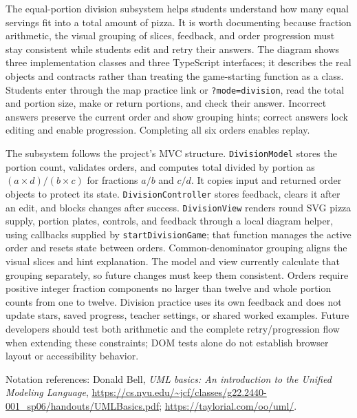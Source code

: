 \documentclass[10pt,letterpaper,landscape]{article}
\begin{document}
\begin{minipage}{0.95\linewidth}
\normalsize
The equal-portion division subsystem helps students understand how many equal servings fit into a total amount of pizza. It is worth documenting because fraction arithmetic, the visual grouping of slices, feedback, and order progression must stay consistent while students edit and retry their answers. The diagram shows three implementation classes and three TypeScript interfaces; it describes the real objects and contracts rather than treating the game-starting function as a class. Students enter through the map practice link or \texttt{?mode=division}, read the total and portion size, make or return portions, and check their answer. Incorrect answers preserve the current order and show grouping hints; correct answers lock editing and enable progression. Completing all six orders enables replay.

The subsystem follows the project's MVC structure. \texttt{DivisionModel} stores the portion count, validates orders, and computes total divided by portion as $(a\times d)/(b\times c)$ for fractions $a/b$ and $c/d$. It copies input and returned order objects to protect its state. \texttt{DivisionController} stores feedback, clears it after an edit, and blocks changes after success. \texttt{DivisionView} renders round SVG pizza supply, portion plates, controls, and feedback through a local diagram helper, using callbacks supplied by \texttt{startDivisionGame}; that function manages the active order and resets state between orders. Common-denominator grouping aligns the visual slices and hint explanation. The model and view currently calculate that grouping separately, so future changes must keep them consistent. Orders require positive integer fraction components no larger than twelve and whole portion counts from one to twelve. Division practice uses its own feedback and does not update stars, saved progress, teacher settings, or shared worked examples. Future developers should test both arithmetic and the complete retry/progression flow when extending these constraints; DOM tests alone do not establish browser layout or accessibility behavior.
\end{minipage}

\vfill
\small
Notation references: Donald Bell, \textit{UML basics: An introduction to the Unified Modeling Language},
\url{https://cs.nyu.edu/~jcf/classes/g22.2440-001_sp06/handouts/UMLBasics.pdf};
\url{https://taylorial.com/oo/uml/}.
\end{document}
